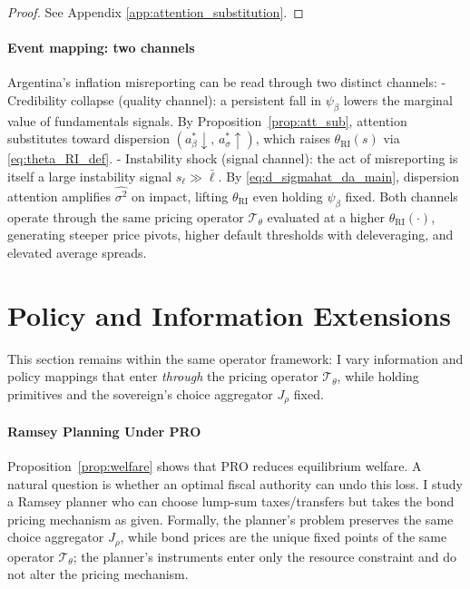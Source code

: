 \documentclass[12pt]{article}
\theoremstyle{plain}
\begin{document}
\begin{proof}
	See Appendix \ref{app:attention_substitution}.
\end{proof}
\paragraph{Event mapping: two channels}
Argentina’s inflation misreporting can be read through two distinct channels: -
Credibility collapse (quality channel): a persistent fall in $\psi_\beta$
lowers the marginal value of fundamentals signals. By
Proposition~\ref{prop:att_sub}, attention substitutes toward dispersion
$(a_\beta^*\downarrow,\,a_\sigma^*\uparrow)$, which raises
$\theta_{\mathrm{RI}}(s)$ via \eqref{eq:theta_RI_def}. - Instability shock
(signal channel): the act of misreporting is itself a large instability signal
$s_\ell\gg\bar\ell$. By \eqref{eq:d_sigmahat_da_main}, dispersion attention
amplifies $\widehat{\sigma^2}$ on impact, lifting $\theta_{\mathrm{RI}}$ even
holding $\psi_\beta$ fixed. Both channels operate through the same pricing
operator $\mathcal T_\theta$ evaluated at a higher
$\theta_{\mathrm{RI}}(\cdot)$, generating steeper price pivots, higher default
thresholds with deleveraging, and elevated average spreads.

\section{Policy and Information Extensions}\label{sec:extensions}

This section remains within the same operator framework: I vary information and
policy mappings that enter \emph{through} the pricing operator $\mathcal
	T_\theta$, while holding primitives and the sovereign's choice aggregator
$J_\rho$ fixed.

\paragraph{Ramsey Planning Under PRO}\label{sec:ramsey}
Proposition~\ref{prop:welfare} shows that PRO reduces equilibrium welfare. A
natural question is whether an optimal fiscal authority can undo this loss. I
study a Ramsey planner who can choose lump-sum taxes/transfers but takes the
bond pricing mechanism as given. Formally, the planner's problem preserves the
same choice aggregator $J_\rho$, while bond prices are the unique fixed points
of the same operator $\mathcal T_\theta$; the planner's instruments enter only
the resource constraint and do not alter the pricing mechanism.
\end{document}
